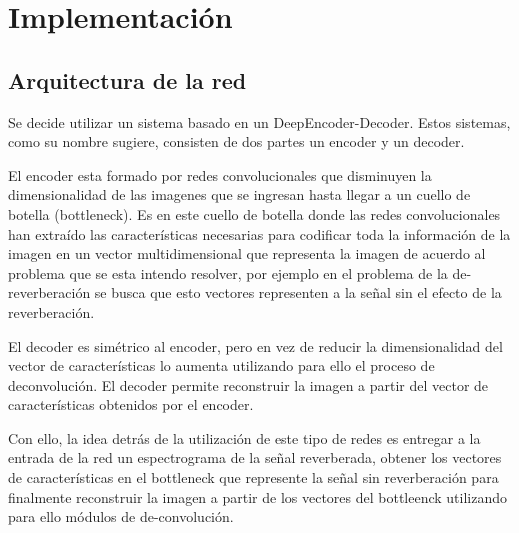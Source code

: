 %
%



\section{Implementación}
\subsection{Arquitectura de la red}

Se decide utilizar un sistema basado en un DeepEncoder-Decoder. Estos sistemas, como su nombre sugiere, consisten de dos partes un encoder y un decoder.

El encoder esta formado por redes convolucionales que disminuyen la dimensionalidad de las imagenes que se ingresan hasta llegar a un cuello de botella (bottleneck). Es en este cuello de botella donde las redes convolucionales han extraído las características necesarias para codificar toda la información de la imagen en un vector multidimensional que representa la imagen de acuerdo al problema que se esta intendo resolver, por ejemplo en el problema de la de-reverberación se busca que esto vectores representen a la señal sin el efecto de la reverberación.

El decoder es simétrico al encoder, pero en vez de reducir la dimensionalidad del vector de características lo aumenta utilizando para ello el proceso de deconvolución. El decoder permite reconstruir la imagen a partir del vector de características obtenidos por el encoder.


Con ello, la idea detrás de la utilización de este tipo de redes es entregar a la entrada de la red un espectrograma de la señal reverberada, obtener los vectores de características en el bottleneck que represente la señal sin reverberación para finalmente reconstruir la imagen a partir de los vectores del bottleenck utilizando para ello módulos de de-convolución.


